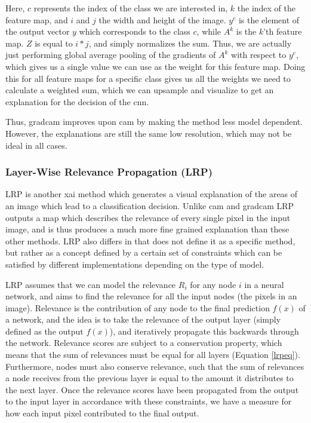 \documentclass[UKenglish]{uiomasterthesis} %
\theoremstyle{definition}
\begin{document}
Here, $c$ represents the index of the class we are interested in, $k$ the index of the feature map, and $i$ and $j$ the width and height of the image. $y^c$ is the element of the output vector $y$ which corresponds to the class $c$, while $A^k$ is the $k$'th feature map. $Z$ is equal to $i * j$, and simply normalizes the sum. Thus, we are actually just performing global average pooling of the gradients of $A^k$ with respect to $y^c$, which gives us a single value we can use as the weight for this feature map. Doing this for all feature maps for a specific class gives us all the weights we need to calculate a weighted sum, which we can upsample and visualize to get an explanation for the decision of the \ac{cnn}.

Thus, \ac{gradcam} improves upon \ac{cam} by making the method less model dependent. However, the explanations are still the same low resolution, which may not be ideal in all cases.
\\


\subsubsection{Layer-Wise Relevance Propagation (LRP)}

LRP is another \ac{xai} method which generates a visual explanation of the areas of an image which lead to a classification decision. Unlike \ac{cam} and \ac{gradcam} LRP outputs a map which describes the relevance of every single pixel in the input image, and is thus produces a much more fine grained explanation than these other methods. LRP also differs in that \cite{lrp} does not define it as a specific method, but rather as a concept defined by a certain set of constraints which can be satisfied by different implementations depending on the type of model.

LRP assumes that we can model the relevance $R_i$ for any node $i$ in a neural network, and aims to find the relevance for all the input nodes (the pixels in an image). Relevance is the contribution of any node to the final prediction $f(x)$ of a network, and the idea is to take the relevance of the output layer (simply defined as the output $f(x)$), and iteratively propagate this backwards through the network. Relevance scores are subject to a conservation property, which means that the sum of relevances must be equal for all layers (Equation \ref{lrpeq}). Furthermore, nodes must also conserve relevance, such that the sum of relevances a node receives from the previous layer is equal to the amount it distributes to the next layer. Once the relevance scores have been propagated from the output to the input layer in accordance with these constraints, we have a measure for how each input pixel contributed to the final output.
\end{document}
